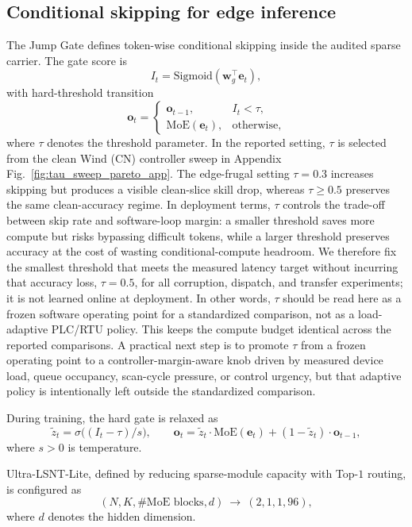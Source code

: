 \documentclass[review,1p,times]{elsarticle}
\begin{document}
\subsection{Conditional skipping for edge inference}
\label{sec:edge}
The Jump Gate defines token-wise conditional skipping inside the audited sparse carrier. The gate score is
\begin{equation}
I_t = \text{Sigmoid}(\mathbf{w}_g^\top \mathbf{e}_t),
\end{equation}
with hard-threshold transition
\begin{equation}
\mathbf{o}_t =
\begin{cases}
\mathbf{o}_{t-1}, & I_t < \tau, \\[4pt]
\text{MoE}(\mathbf{e}_t), & \text{otherwise},
\end{cases}
\end{equation}
where $\tau$ denotes the threshold parameter.
In the reported setting, $\tau$ is selected from the clean Wind (CN) controller sweep in Appendix Fig.~\ref{fig:tau_sweep_pareto_app}. The edge-frugal setting $\tau=0.3$ increases skipping but produces a visible clean-slice skill drop, whereas $\tau\ge0.5$ preserves the same clean-accuracy regime. In deployment terms, $\tau$ controls the trade-off between skip rate and software-loop margin: a smaller threshold saves more compute but risks bypassing difficult tokens, while a larger threshold preserves accuracy at the cost of wasting conditional-compute headroom. We therefore fix the smallest threshold that meets the measured latency target without incurring that accuracy loss, $\tau=0.5$, for all corruption, dispatch, and transfer experiments; it is not learned online at deployment. In other words, $\tau$ should be read here as a frozen software operating point for a standardized comparison, not as a load-adaptive PLC/RTU policy. This keeps the compute budget identical across the reported comparisons. A practical next step is to promote $\tau$ from a frozen operating point to a controller-margin-aware knob driven by measured device load, queue occupancy, scan-cycle pressure, or control urgency, but that adaptive policy is intentionally left outside the standardized comparison.

During training, the hard gate is relaxed as
\[
\tilde z_t=\sigma\!\big((I_t-\tau)/s\big),\qquad
\mathbf{o}_t = \tilde z_t\cdot\mathrm{MoE}(\mathbf{e}_t) + (1-\tilde z_t)\cdot\mathbf{o}_{t-1},
\]
where $s>0$ is temperature.


Ultra-LSNT-Lite, defined by reducing sparse-module capacity with Top-$1$ routing, is configured as
\begin{equation}
(N,K,\text{\#MoE blocks},d) \ \rightarrow \ (2,1,1,96),
\end{equation}
where $d$ denotes the hidden dimension.
\end{document}
